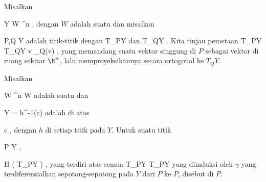 {}
{

Misalkan

\mavergleichskette
{\vergleichskette
{ Y
}
{ \subseteq }{ W
}
{ \subseteq }{ \R^n
}
{    }{
}
{   }{
}
}
{}{}{,}
dengan $W$
adalah suatu
dan misalkan

\mavergleichskette
{\vergleichskette
{ P,Q
}
{ \in }{ Y
}
{  }{
}
{    }{
}
{   }{
}
}
{}{}{}
adalah titik-titik dengan
\mathkor {} {T_PY} {dan} {T_QY} {.}
Kita tinjau pemetaan
 {T_PY} { T_QY
} { v } { \pi_Q(v)
} {,}
yang memandang suatu vektor singgung di $P$ sebagai vektor di ruang sekitar $\R^n$, lalu memproyeksikannya secara ortogonal ke $T_QY$.

}
{} {}

Misalkan

\mavergleichskette
{\vergleichskette
{ W
}
{ \subseteq }{ \R^n
}
{  }{
}
{    }{
}
{   }{
}
}
{}{}{}
 { W } { \R
} {}
adalah suatu
dan

\mavergleichskette
{\vergleichskette
{ Y
}
{ = }{ h^{-1}(c)
}
{  }{
}
{    }{
}
{   }{
}
}
{}{}{}
adalah
di atas

\mavergleichskette
{\vergleichskette
{ c
}
{ \in }{ \R
}
{  }{
}
{    }{
}
{   }{
}
}
{}{}{,}
dengan $h$
di setiap titik pada $Y$. Untuk suatu titik

\mavergleichskette
{\vergleichskette
{ P
}
{ \in }{ Y
}
{  }{
}
{    }{
}
{   }{
}
}
{}{}{,}

\mavergleichskette
{\vergleichskette
{ H
}
{ \subseteq }{  \left(  T_PY  \right)
}
{  }{
}
{    }{
}
{   }{
}
}
{}{}{,}
yang terdiri atas semua
\maabbdisp {\Psi_\gamma} {T_PY} {T_PY
} {}
yang diinduksi oleh
$\gamma$ yang terdiferensialkan sepotong-sepotong pada $Y$ dari $P$ ke $P$, disebut
di $P$.


